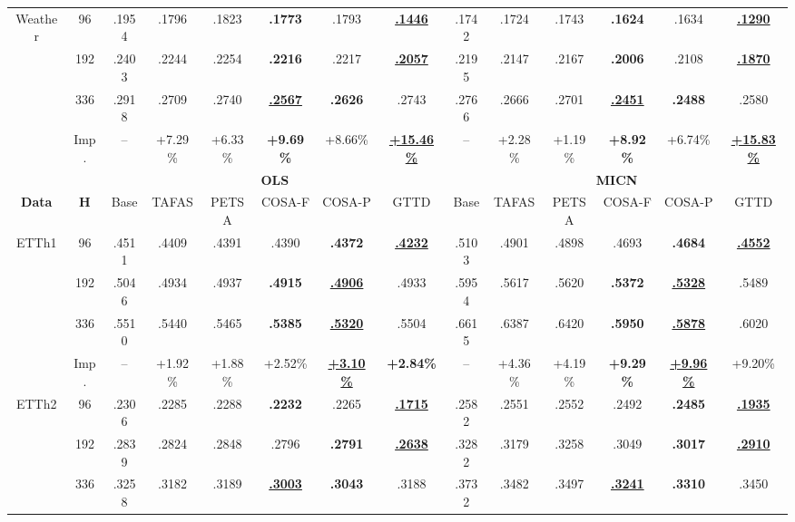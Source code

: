 \documentclass{article}
\begin{document}
\begin{table}[t]
{\begin{tabular}{cc*{12}{c}}
\midrule
\multirow{4}{*}{Weather} & 96 & .1954 & .1796 & .1823 & \textbf{.1773} & .1793 & \underline{\textbf{.1446}} & .1742 & .1724 & .1743 & \textbf{.1624} & .1634 & \underline{\textbf{.1290}} \\
 & 192 & .2403 & .2244 & .2254 & \textbf{.2216} & .2217 & \underline{\textbf{.2057}} & .2195 & .2147 & .2167 & \textbf{.2006} & .2108 & \underline{\textbf{.1870}} \\
 & 336 & .2918 & .2709 & .2740 & \underline{\textbf{.2567}} & \textbf{.2626} & .2743 & .2766 & .2666 & .2701 & \underline{\textbf{.2451}} & \textbf{.2488} & .2580 \\
 & Imp. & -- & +7.29\% & +6.33\% & \textbf{+9.69\%} & +8.66\% & \underline{\textbf{+15.46\%}} & -- & +2.28\% & +1.19\% & \textbf{+8.92\%} & +6.74\% & \underline{\textbf{+15.83\%}} \\
\midrule
\midrule
& & \multicolumn{6}{c}{\textbf{OLS}} & \multicolumn{6}{c}{\textbf{MICN}} \\
\cmidrule(lr){3-8}\cmidrule(lr){9-14}
\textbf{Data} & \textbf{H} & Base & TAFAS & PETSA & COSA-F & COSA-P & GTTD & Base & TAFAS & PETSA & COSA-F & COSA-P & GTTD \\
\midrule
\multirow{4}{*}{ETTh1} & 96 & .4511 & .4409 & .4391 & .4390 & \textbf{.4372} & \underline{\textbf{.4232}} & .5103 & .4901 & .4898 & .4693 & \textbf{.4684} & \underline{\textbf{.4552}} \\
 & 192 & .5046 & .4934 & .4937 & \textbf{.4915} & \underline{\textbf{.4906}} & .4933 & .5954 & .5617 & .5620 & \textbf{.5372} & \underline{\textbf{.5328}} & .5489 \\
 & 336 & .5510 & .5440 & .5465 & \textbf{.5385} & \underline{\textbf{.5320}} & .5504 & .6615 & .6387 & .6420 & \textbf{.5950} & \underline{\textbf{.5878}} & .6020 \\
 & Imp. & -- & +1.92\% & +1.88\% & +2.52\% & \underline{\textbf{+3.10\%}} & \textbf{+2.84\%} & -- & +4.36\% & +4.19\% & \textbf{+9.29\%} & \underline{\textbf{+9.96\%}} & +9.20\% \\
\midrule
\multirow{4}{*}{ETTh2} & 96 & .2306 & .2285 & .2288 & \textbf{.2232} & .2265 & \underline{\textbf{.1715}} & .2582 & .2551 & .2552 & .2492 & \textbf{.2485} & \underline{\textbf{.1935}} \\
 & 192 & .2839 & .2824 & .2848 & .2796 & \textbf{.2791} & \underline{\textbf{.2638}} & .3282 & .3179 & .3258 & .3049 & \textbf{.3017} & \underline{\textbf{.2910}} \\
 & 336 & .3258 & .3182 & .3189 & \underline{\textbf{.3003}} & \textbf{.3043} & .3188 & .3732 & .3482 & .3497 & \underline{\textbf{.3241}} & \textbf{.3310} & .3450 \\

\end{tabular}}
\end{table}
\end{document}

